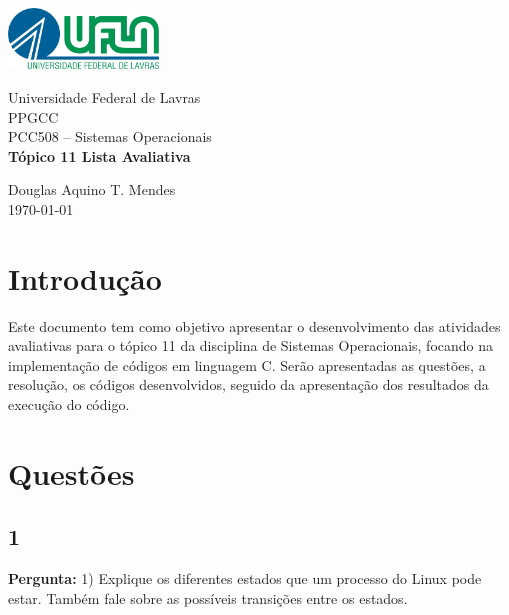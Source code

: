 \documentclass{article}
\begin{document}
\begin{titlepage}
    \centering
    \includegraphics[width=0.3\textwidth]{../Topic1/Avaliativo/Imagens/Logo UFLA - Colorida chapada.png}

    \vspace*{2cm} %
    \Large
    Universidade Federal de Lavras\\
    PPGCC\\
    PCC508 – Sistemas Operacionais\\
    
    \vspace{2cm} %
    \huge %
    \textbf{Tópico 11 Lista Avaliativa}
    
    \vfill %
    
    \large
    Douglas Aquino T. Mendes\\
    \today %
\end{titlepage}

\tableofcontents
\newpage

\section{Introdução}
Este documento tem como objetivo apresentar o desenvolvimento das atividades avaliativas para o tópico 11 da disciplina de Sistemas Operacionais, focando na implementação de códigos em linguagem C. Serão apresentadas as questões, a resolução, os códigos desenvolvidos, seguido da apresentação dos resultados da execução do código.

\section{Questões}

\subsection{1}
\textbf{Pergunta:} 1) Explique os diferentes estados que um processo do Linux pode estar. Também fale sobre as possíveis transições entre os estados.\newline
\end{document}
